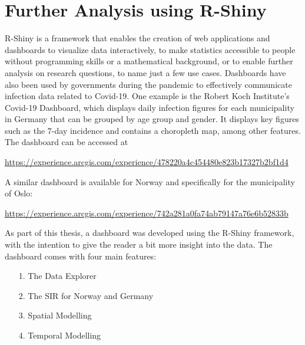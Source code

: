 %
\chapter{Further Analysis using R-Shiny}\label{ch:shiny}
R-Shiny is a framework that enables the creation of web applications and dashboards to visualize data interactively, to make statistics accessible to people without programming skills or a mathematical background, or to enable further analysis on research questions, to name just a few use cases. Dashboards have also been used by governments during the pandemic to effectively communicate infection data related to Covid-19. One example is the Robert Koch Institute's Covid-19 Dashboard, which displays daily infection figures for each municipality in Germany that can be grouped by age group and gender. It displays key figures such as the 7-day incidence and contains a choropleth map, among other features. The dashboard can be accessed at
\begin{center}
    \href{https://experience.arcgis.com/experience/478220a4c454480e823b17327b2bf1d4}{https://experience.arcgis.com/experience/478220a4c454480e823b17327b2bf1d4}
\end{center}
A similar dashboard is available for Norway and specifically for the municipality of Oslo:
\begin{center}
    \href{https://experience.arcgis.com/experience/742a281a0fa74ab79147a76e6b52833b}{https://experience.arcgis.com/experience/742a281a0fa74ab79147a76e6b52833b}
\end{center}
As part of this thesis, a dashboard was developed using the R-Shiny framework, with the intention to give the reader a bit more insight into the data. The dashboard comes with four main features:
\begin{itemize}
    \item[1.] The Data Explorer
    \item[2.] The SIR for Norway and Germany
    \item[3.] Spatial Modelling
    \item[4.] Temporal Modelling
\end{itemize}
\clearpage
